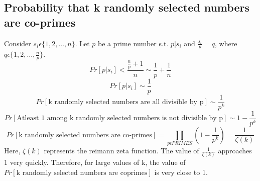 \documentclass[11.5pt, paper=a4]{article}
\theoremstyle{definition}
\numberwithin{theorem}{section}
\begin{document}
\subsection{Probability that k randomly selected numbers are co-primes}
Consider $s_i\epsilon\{1,2,\dots,n\}$. Let $p$ be a prime number s.t. $p\vert s_i$ and $\frac{s_i}{p} = q$, where $q\epsilon\{1,2,\dots,\frac{n}{p}\}$.
\begin{equation*}
    Pr[p\vert s_i] < \frac{\frac{n}{p} + 1}{n} \sim \frac{1}{p} + \frac{1}{n}
\end{equation*}
\begin{equation*}
    Pr[p\vert s_i]\sim \frac{1}{p}
\end{equation*}
\begin{equation*}
    Pr[\text{k randomly selected numbers are all divisible by p}] \sim \frac{1}{p^k}
\end{equation*}
\begin{equation*}
    Pr[\text{Atleast 1 among k randomly selected numbers is not divisible by p}] \sim 1-\frac{1}{p^k}
\end{equation*}
\begin{equation*}
    Pr[\text{k randomly selected numbers are co-primes}] = \prod_{p\epsilon PRIMES}(1-\frac{1}{p^k}) = \frac{1}{\zeta (k)}
\end{equation*}
Here, $\zeta (k)$ represents the reimann zeta function. The value of $\frac{1}{\zeta (k)}$ approaches 1 very quickly. Therefore, for large values of k, the value of $Pr[\text{k randomly selected numbers are coprimes}]$ is very close to 1.


\end{document}
